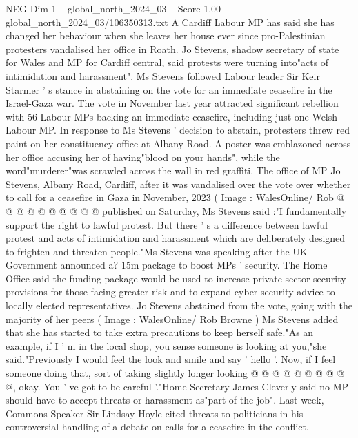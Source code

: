 \begin{textsample}{NEG Dim 1 – global\_north\_2024\_03 – Score 1.00 – global\_north\_2024\_03/106350313.txt}  \label{ex:f1_neg_389}
A Cardiff Labour MP has said she has changed her behaviour when she leaves her house ever since pro-Palestinian protesters vandalised her office in Roath.
Jo Stevens, shadow secretary of state for Wales and MP for Cardiff central, said protests were turning into"acts of intimidation and harassment".
Ms Stevens followed Labour leader Sir Keir Starmer ' s stance in abstaining on the vote for an immediate ceasefire in the Israel-Gaza war.
The vote in November last year attracted significant rebellion with 56 Labour MPs backing an immediate ceasefire, including just one Welsh Labour MP.
In response to Ms Stevens ' decision to abstain, protesters threw red paint on her constituency office at Albany Road.
A poster was emblazoned across her office accusing her of having"blood on your hands", while the word"murderer"was scrawled across the wall in red graffiti.
The office of MP Jo Stevens, Albany Road, Cardiff, after it was vandalised over the vote over whether to call for a ceasefire in Gaza in November, 2023 ( Image : WalesOnline/ Rob @ @ @ @ @ @ @ @ @ @ published on Saturday, Ms Stevens said :"I fundamentally support the right to lawful protest.
But there ' s a difference between lawful protest and acts of intimidation and harassment which are deliberately designed to frighten and threaten people."Ms Stevens was speaking after the UK Government announced a? 15m package to boost MPs ' security.
The Home Office said the funding package would be used to increase private sector security provisions for those facing greater risk and to expand cyber security advice to locally elected representatives.
Jo Stevens abstained from the vote, going with the majority of her peers ( Image : WalesOnline/ Rob Browne ) Ms Stevens added that she has started to take extra precautions to keep herself safe."As an example, if I ' m in the local shop, you sense someone is looking at you,"she said."Previously I would feel the look and smile and say ' hello '.
Now, if I feel someone doing that, sort of taking slightly longer looking @ @ @ @ @ @ @ @ @ @, okay.
You ' ve got to be careful '."Home Secretary James Cleverly said no MP should have to accept threats or harassment as"part of the job".
Last week, Commons Speaker Sir Lindsay Hoyle cited threats to politicians in his controversial handling of a debate on calls for a ceasefire in the conflict.

\end{textsample}

